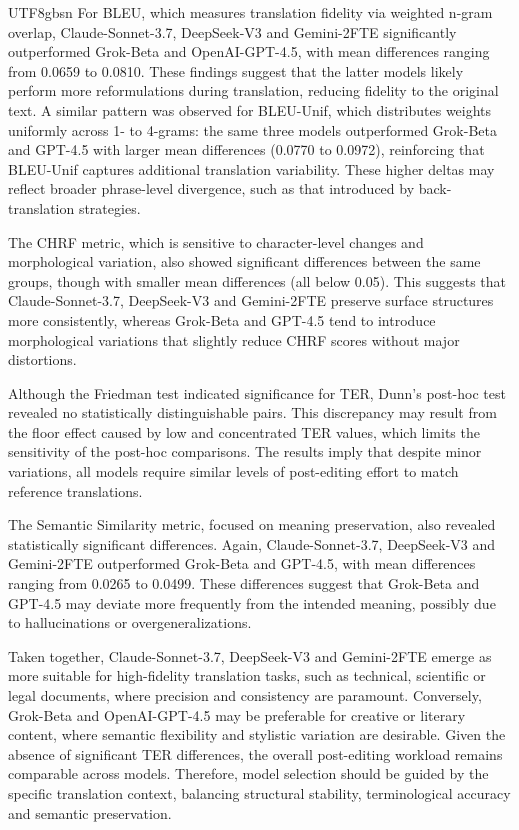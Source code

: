 \documentclass[conference]{IEEEtran}
\begin{document}
\begin{CJK}{UTF8}{gbsn}
For BLEU, which measures translation fidelity via weighted n-gram overlap, Claude-Sonnet-3.7, DeepSeek-V3 and Gemini-2FTE significantly outperformed Grok-Beta and OpenAI-GPT-4.5, with mean differences ranging from 0.0659 to 0.0810. These findings suggest that the latter models likely perform more reformulations during translation, reducing fidelity to the original text. A similar pattern was observed for BLEU-Unif, which distributes weights uniformly across 1- to 4-grams: the same three models outperformed Grok-Beta and GPT-4.5 with larger mean differences (0.0770 to 0.0972), reinforcing that BLEU-Unif captures additional translation variability. These higher deltas may reflect broader phrase-level divergence, such as that introduced by back-translation strategies.

The CHRF metric, which is sensitive to character-level changes and morphological variation, also showed significant differences between the same groups, though with smaller mean differences (all below 0.05). This suggests that Claude-Sonnet-3.7, DeepSeek-V3 and Gemini-2FTE preserve surface structures more consistently, whereas Grok-Beta and GPT-4.5 tend to introduce morphological variations that slightly reduce CHRF scores without major distortions.

Although the Friedman test indicated significance for TER, Dunn’s post-hoc test revealed no statistically distinguishable pairs. This discrepancy may result from the floor effect caused by low and concentrated TER values, which limits the sensitivity of the post-hoc comparisons. The results imply that despite minor variations, all models require similar levels of post-editing effort to match reference translations.

The Semantic Similarity metric, focused on meaning preservation, also revealed statistically significant differences. Again, Claude-Sonnet-3.7, DeepSeek-V3 and Gemini-2FTE outperformed Grok-Beta and GPT-4.5, with mean differences ranging from 0.0265 to 0.0499. These differences suggest that Grok-Beta and GPT-4.5 may deviate more frequently from the intended meaning, possibly due to hallucinations or overgeneralizations.

Taken together, Claude-Sonnet-3.7, DeepSeek-V3 and Gemini-2FTE emerge as more suitable for high-fidelity translation tasks, such as technical, scientific or legal documents, where precision and consistency are paramount. Conversely, Grok-Beta and OpenAI-GPT-4.5 may be preferable for creative or literary content, where semantic flexibility and stylistic variation are desirable. Given the absence of significant TER differences, the overall post-editing workload remains comparable across models. Therefore, model selection should be guided by the specific translation context, balancing structural stability, terminological accuracy and semantic preservation.


\end{CJK}
\end{document}
